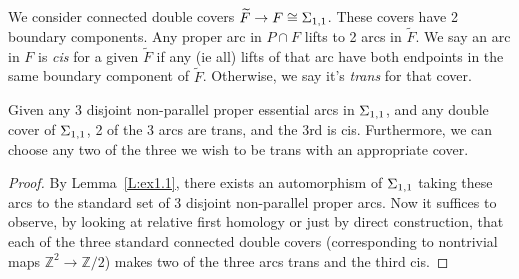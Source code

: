 We consider connected double covers $\widetilde{F} \to F \cong \Sigma_{1,1}$.
These covers have 2 boundary components. Any proper arc in $P \cap F$ lifts to
2 arcs in $\widetilde{F}$.  We say an arc in $F$ is \emph{cis} for a given
$\widetilde{F}$ if any (ie all) lifts of that arc have both endpoints in the
same boundary component of $\widetilde{F}$.  Otherwise, we say it's
\emph{trans} for that cover.

\begin{lemma}\label{L:ex1.2}

Given any 3 disjoint non-parallel proper essential arcs in $\Sigma_{1,1}$, and any
double cover of $\Sigma_{1,1}$, 2 of the 3 arcs are trans, and the 3rd is cis.
Furthermore, we can choose any two of the three we wish to be trans with an
appropriate cover.

\end{lemma}
\begin{proof}

By Lemma~\ref{L:ex1.1}, there exists an automorphism of $\Sigma_{1,1}$ taking
these arcs to the standard set of 3 disjoint non-parallel proper arcs. Now it
suffices to observe, by looking at relative first homology or just by direct
construction, that each of the three standard connected double covers
(corresponding to nontrivial maps $\mathbb{Z}^2 \to \mathbb{Z}/2$) makes two of
the three arcs trans and the third cis.

\end{proof}

